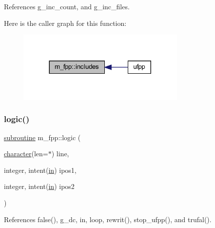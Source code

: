 References g\+\_\+inc\+\_\+count, and g\+\_\+inc\+\_\+files.

Here is the caller graph for this function\+:
\nopagebreak
\begin{figure}[H]
\begin{center}
\leavevmode
\includegraphics[width=236pt]{namespacem__fpp_ae2377b0a62c6cfcf80593df3126cd45f_icgraph}
\end{center}
\end{figure}
\mbox{\label{namespacem__fpp_ae036546bab009c772421d3f4e34ca93c}} 
\subsubsection{\texorpdfstring{logic()}{logic()}}
{\footnotesize\ttfamily \hyperlink{M__stopwatch_83_8txt_acfbcff50169d691ff02d4a123ed70482}{subroutine} m\+\_\+fpp\+::logic (\begin{DoxyParamCaption}\item[{\hyperlink{option__stopwatch_83_8txt_abd4b21fbbd175834027b5224bfe97e66}{character}(len=$\ast$)}]{line,  }\item[{integer, intent(\hyperlink{M__journal_83_8txt_afce72651d1eed785a2132bee863b2f38}{in})}]{ipos1,  }\item[{integer, intent(\hyperlink{M__journal_83_8txt_afce72651d1eed785a2132bee863b2f38}{in})}]{ipos2 }\end{DoxyParamCaption})}



References false(), g\+\_\+dc, in, loop, rewrit(), stop\+\_\+ufpp(), and trufal().

